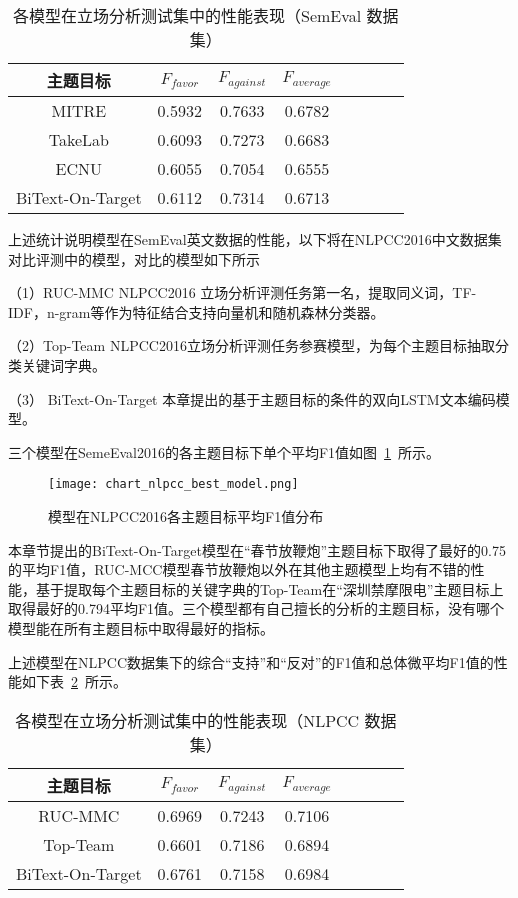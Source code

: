 \begin{table}[htbp]
	\caption[table123]{各模型在立场分析测试集中的性能表现（SemEval 数据集）}
	\vspace{0.5em}\centering\wuhao
	\label{semeval_res}
	\begin{tabular}{cccccccc}
		\toprule[1.5pt]
		主题目标& $F_{favor}$&$F_{against}$&$F_{average}$ \\
		\midrule[1pt]
		MITRE\citeup{zarrella2016mitre}&0.5932&0.7633&0.6782\\
		TakeLab\citeup{tutek2016takelab} &0.6093&0.7273&0.6683\\
		ECNU\citeup{zhang2016ecnu}&0.6055&0.7054&0.6555\\
		BiText-On-Target&0.6112&0.7314&0.6713\\
		\bottomrule[1.5pt]
	\end{tabular}
\end{table}

上述统计说明模型在SemEval英文数据的性能，以下将在NLPCC2016中文数据集对比评测中的模型，对比的模型如下所示

（1）RUC-MMC NLPCC2016 立场分析评测任务第一名，提取同义词，TF-IDF，n-gram等作为特征结合支持向量机和随机森林分类器。

（2）Top-Team NLPCC2016立场分析评测任务参赛模型，为每个主题目标抽取分类关键词字典。

（3） BiText-On-Target 本章提出的基于主题目标的条件的双向LSTM文本编码模型。

三个模型在SemeEval2016的各主题目标下单个平均F1值如图~\ref{chart_nlpcc_best_model}~所示。
\begin{figure}[htbp]
	\centering
	\texttt{[image: chart\_nlpcc\_best\_model.png]}
	\caption[rnn_vanish]{模型在NLPCC2016各主题目标平均F1值分布}
	\label{chart_nlpcc_best_model}
\end{figure}

本章节提出的BiText-On-Target模型在“春节放鞭炮”主题目标下取得了最好的0.75的平均F1值，RUC-MCC模型春节放鞭炮以外在其他主题模型上均有不错的性能，基于提取每个主题目标的关键字典的Top-Team在“深圳禁摩限电”主题目标上取得最好的0.794平均F1值。三个模型都有自己擅长的分析的主题目标，没有哪个模型能在所有主题目标中取得最好的指标。

上述模型在NLPCC数据集下的综合“支持”和“反对”的F1值和总体微平均F1值的性能如下表~\ref{nlpcc_res}~所示。
\begin{table}[htbp]
	\caption[table123]{各模型在立场分析测试集中的性能表现（NLPCC 数据集）}
	\label{nlpcc_res}
	\vspace{0.5em}\centering\wuhao
	\begin{tabular}{cccccccc}
		\toprule[1.5pt]
		主题目标& $F_{favor}$&$F_{against}$&$F_{average}$ \\
		\midrule[1pt]
		RUC-MMC\citeup{xu2016overview}&0.6969&0.7243&0.7106\\
		Top-Team\citeup{xu2016overview}&0.6601&0.7186&0.6894\\
		BiText-On-Target&0.6761&0.7158&0.6984\\
		\bottomrule[1.5pt]
	\end{tabular}
\end{table}

